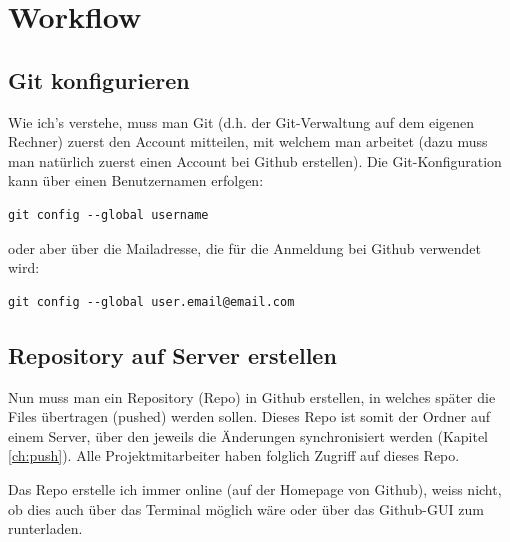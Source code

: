 \documentclass[twoside, 11pr]{article}
\begin{document}
\section{Workflow}

\subsection{Git konfigurieren}

Wie ich's verstehe, muss man Git (d.h. der Git-Verwaltung auf dem eigenen Rechner) zuerst den Account mitteilen, mit welchem man arbeitet (dazu muss man natürlich zuerst einen Account bei Github erstellen). Die Git-Konfiguration kann über einen Benutzernamen erfolgen:

\begin{lstlisting}
git config --global username
\end{lstlisting}

\noindent
oder aber über die Mailadresse, die für die Anmeldung bei Github verwendet wird:

\begin{lstlisting}
git config --global user.email@email.com
\end{lstlisting}


\subsection{Repository auf Server erstellen}\label{ch:gitRepo}

Nun muss man ein Repository (Repo) in Github erstellen, in welches später die Files übertragen (pushed) werden sollen. Dieses Repo ist somit der Ordner auf einem Server, über den jeweils die Änderungen synchronisiert werden (Kapitel \ref{ch:push}). Alle Projektmitarbeiter haben folglich Zugriff auf dieses Repo. \par
Das Repo erstelle ich immer online (auf der Homepage von Github), weiss nicht, ob dies auch über das Terminal möglich wäre oder über das Github-GUI zum runterladen.
\end{document}
